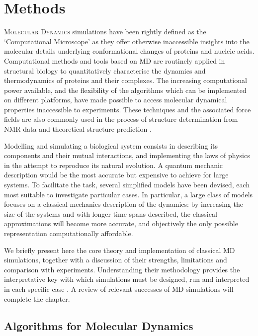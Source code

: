 \chapter{Methods} \label{chapter:MD}

\lettrine{M}{olecular Dynamics} simulations have been rightly defined as the `Computational Microscope' \cite{Lee2009,Dror2012} as they offer otherwise inaccessible insights into the molecular details underlying conformational changes of proteins and nucleic acids. Computational methods and tools based on MD are routinely applied in structural biology to quantitatively characterise the dynamics and thermodynamics of proteins and their complexes. The increasing computational power available, and the flexibility of the algorithms which can be implemented on different platforms, have made possible to access molecular dynamical properties inaccessible to experiments. These techniques and the associated force fields are also commonly used in the process of structure determination from NMR data and theoretical structure prediction \cite{Vogel2017,Heo2018}.

Modelling and simulating a biological system consists in describing its components and their mutual interactions, and implementing the laws of physics in the attempt to reproduce its natural evolution. A quantum mechanic description would be the most accurate but expensive to achieve for large systems. To facilitate the task, several simplified models have been devised, each most suitable to investigate particular cases.
%
In particular, a large class of models focuses on a classical mechanics description of the dynamics: by increasing the size of the systems and with longer time spans described, the classical approximations will become more accurate, and objectively the only possible representation computationally affordable.

We briefly present here the core theory and implementation of classical MD simulations, together with a discussion of their strengths, limitations and comparison with experiments. Understanding their methodology provides the interpretative key with which simulations must be designed, run and interpreted in each specific case \cite{vanGunsteren2006}. A review of relevant successes of MD simulations will complete the chapter.


\section{Algorithms for Molecular Dynamics}

